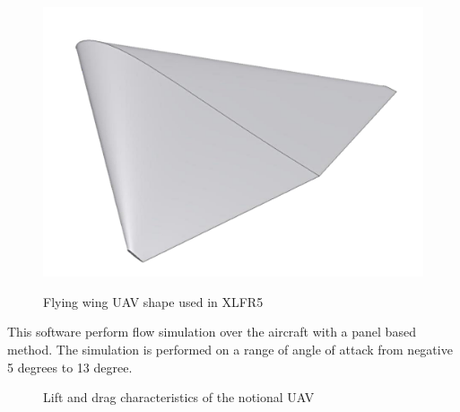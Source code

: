 \begin{figure}[ht]
	\begin{center}
	\scalebox{0.5}            %
 	{\includegraphics{./Figures/UAV.png}}
	\end{center}
	\caption{Flying wing UAV shape used in XLFR5}
	\label{fig:UAV}
\end{figure}

\par This software perform flow simulation over the aircraft with a panel based method. 
The simulation is performed on a range of angle of attack from negative 5 degrees to 13 degree.

\begin{figure}[h!]
	\centering
	\caption{Lift and drag characteristics of the notional UAV}
	\label{fig:Cd_and_Cl_UAV}
\end{figure}

